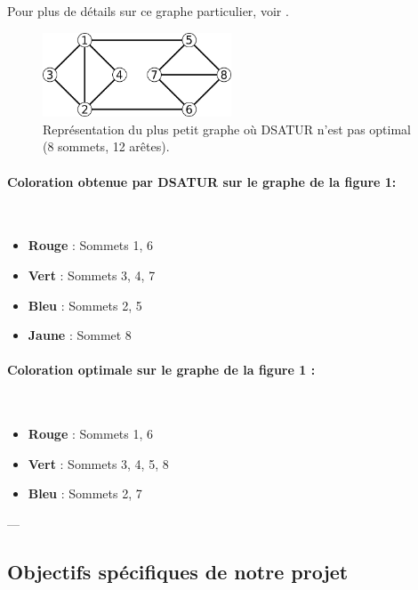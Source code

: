\documentclass[11pt]{article}
\begin{document}
Pour plus de détails sur ce graphe particulier, voir \cite{smallest_hard_dsatur}.

\begin{figure}[H] %
    \centering
    \includegraphics[width=0.5\textwidth]{JKMP_graphe.png}
    \caption{Représentation du plus petit graphe où DSATUR n'est pas optimal (8 sommets, 12 arêtes).}
    \label{fig:dsatur_non_optimal_graph}
\end{figure}
\paragraph{Coloration obtenue par DSATUR sur le graphe de la figure 1:} \\
\begin{itemize}
    \item \textbf{Rouge} : Sommets 1, 6
    \item \textbf{Vert} : Sommets 3, 4, 7
    \item \textbf{Bleu} : Sommets 2, 5
    \item \textbf{Jaune} : Sommet 8
\end{itemize}

\paragraph{Coloration optimale sur le graphe de la figure 1 :} \\
\begin{itemize}
    \item \textbf{Rouge} : Sommets 1, 6
    \item \textbf{Vert} : Sommets 3, 4, 5, 8
    \item \textbf{Bleu} : Sommets 2, 7
\end{itemize}

---

\subsection{Objectifs spécifiques de notre projet}
\end{document}
